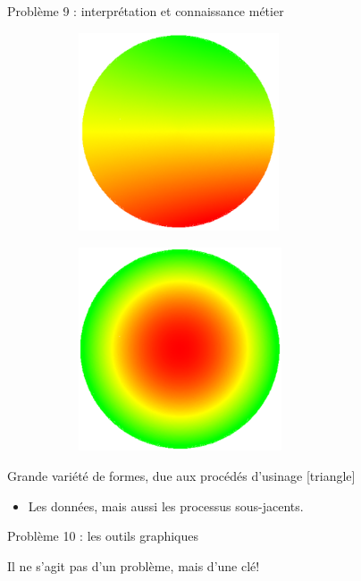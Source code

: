 \documentclass[10pt]{beamer}
\begin{document}
\begin{frame} {Problème 9 : interprétation et connaissance métier}
\begin{figure}[H]
\begin{subfigure}[l]{0.3\textwidth}
\centering
\includegraphics[width=0.65\textwidth, height=0.6\textwidth]{figures/profil_laser.png}
\label{fige}
\end{subfigure}%
\hspace{0.13\textwidth}
\begin{subfigure}[l]{0.3\textwidth}
\centering
\includegraphics[width=0.66\textwidth, height=0.6\textwidth]{figures/profil_cvd.png}
\label{fige}
\end{subfigure}%
\end{figure}

\begin{block}{Grande variété de formes, due aux procédés d'usinage}
[triangle]
\begin{itemize}
\item Les données, mais aussi les processus sous-jacents. 
\end{itemize} 
\end{block}
\end{frame}
\begin{frame} {Problème 10 : les outils graphiques}
 
\begin{block}{Il ne s'agit pas d'un problème, mais d'une clé!}
\end{block}
\end{frame}
\end{document}
